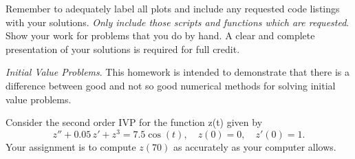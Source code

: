 \documentclass[12pt]{exam}
\renewcommand*{\vec}[1]{\boldsymbol{#1}}
\begin{document}
Remember to adequately label all plots and include any requested code listings with your solutions. \emph{Only include those scripts and functions which are requested}. Show your work for problems that you do by hand. A clear and complete presentation of your solutions is required for full credit.

\begin{questions}

\question \emph{Initial Value Problems}. This homework is intended to demonstrate that there is a difference between good and not so good numerical methods for solving initial value problems.

Consider the second order IVP for the function z(t) given by
\[z'' + 0.05\,z' + z^3 = 7.5 \cos(t), \quad z(0) = 0,\quad z'(0) = 1.\]
Your assignment is to compute $z(70)$ as accurately as your computer allows.

\end{questions}
\end{document}
